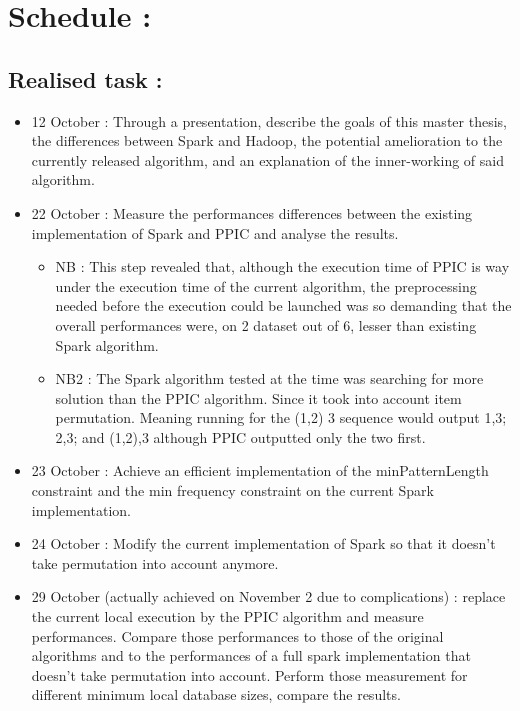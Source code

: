 \documentclass[10pt]{article}
\begin{document}
\section{Schedule :}

\subsection{Realised task :}

\begin{itemize}
\item 12 October : Through a presentation, describe the goals of this master thesis, the differences between Spark and Hadoop, the potential amelioration to the currently released algorithm, and an explanation of the inner-working of said algorithm.

\item 22 October : Measure the performances differences between the existing implementation of Spark and PPIC and analyse the results.

\begin{itemize}

\item NB : This step revealed that, although the execution time of PPIC is way under the execution time of the current algorithm, the preprocessing needed before the execution could be launched was so demanding that the overall performances were, on 2 dataset out of 6, lesser than existing Spark algorithm.

\item NB2 : The Spark algorithm tested at the time was searching for more solution than the PPIC algorithm. Since it took into account item permutation. Meaning running for the (1,2) 3 sequence would output 1,3; 2,3; and (1,2),3 although PPIC outputted only the two first.

\end{itemize}

\item 23 October : Achieve an efficient implementation of the minPatternLength constraint and the min frequency constraint on the current Spark implementation.

\item 24 October : Modify the current implementation of Spark so that it doesn't take permutation into account anymore.

\item 29 October (actually achieved on November 2 due to complications) : replace the current local execution by the PPIC algorithm and measure performances.
Compare those performances to those of the original algorithms and to the performances of a full spark implementation that doesn't take permutation into account.
Perform those measurement for different minimum local database sizes, compare the results.


\end{itemize}
\end{document}
